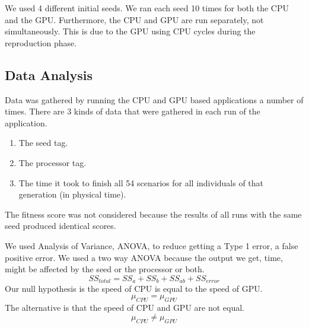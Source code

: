 We used 4 different initial seeds. We ran each seed 10 times for both the CPU and 
the GPU. Furthermore, the CPU and GPU are run separately, not simultaneously. This
is due to the GPU using CPU cycles during the reproduction phase.

\subsection{Data Analysis}
Data was gathered by running the CPU and GPU based applications a number of
times. There are 3 kinds of data that were gathered in each run of the application.
\begin{enumerate}
  \item The seed tag.
  \item The processor tag.
  \item The time it took to finish all 54 scenarios for all individuals of 
that generation (in physical time).
\end{enumerate}
The fitness score was not considered because the results of all runs with the
same seed produced identical scores.


We used Analysis of Variance, ANOVA, to reduce getting a Type 1 error, a false
positive error. We used a two way ANOVA because the output we get, time, might
be affected by the seed or the processor or both.
$$
SS_{total} = SS_a + SS_b + SS_{ab} + SS_{error}
$$
Our null hypothesis is the speed of CPU is equal to the speed of GPU.
$$
\mu_{CPU} = \mu_{GPU}
$$
The alternative is that the speed of CPU and GPU are not equal.
$$
\mu_{CPU} \neq \mu_{GPU}
$$
